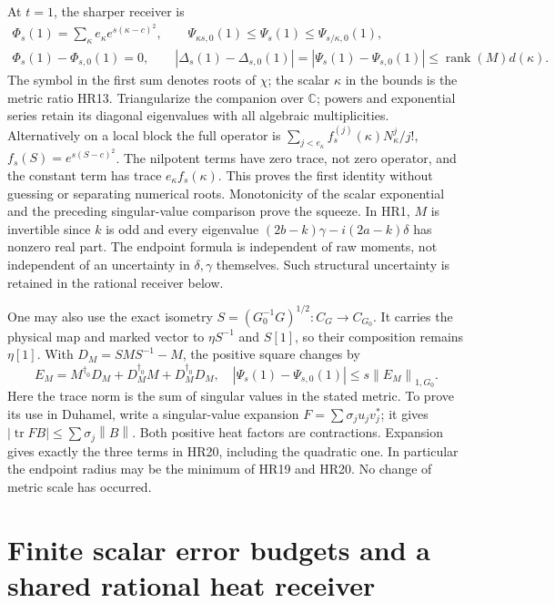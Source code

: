 \documentclass[11pt]{article}
\newcommand{\C}{\mathbb C}\newcommand{\R}{\mathbb R}
\newcommand{\tr}{\operatorname{tr}}\newcommand{\dd}{\dagger_G}
\newcommand{\norm}[1]{\left\lVert#1\right\rVert}
\begin{document}
At \(t=1\), the sharper receiver is
\begin{equation}\tag{HR19}\label{HR19}
\begin{gathered}
\Phi_s(1)=\sum_\kappa e_\kappa e^{s(\kappa-c)^2},\qquad
\Psi_{\kappa s,0}(1)\le\Psi_s(1)\le\Psi_{s/\kappa,0}(1),\\
\Phi_s(1)-\Phi_{s,0}(1)=0,\qquad
|\Delta_s(1)-\Delta_{s,0}(1)|
=|\Psi_s(1)-\Psi_{s,0}(1)|\le \operatorname{rank}(M)d(\kappa).
\end{gathered}
\end{equation}
The symbol in the first sum denotes roots of \(\chi\); the scalar
\(\kappa\) in the bounds is the metric ratio HR13. Triangularize
the companion over \(\C\); powers and exponential series retain its
diagonal eigenvalues with all algebraic multiplicities. Alternatively
on a local block the full operator is
\(\sum_{j<e_\kappa}f_s^{(j)}(\kappa)N_\kappa^j/j!\),
\(f_s(S)=e^{s(S-c)^2}\). The nilpotent terms have zero trace, not
zero operator, and the constant term has trace
\(e_\kappa f_s(\kappa)\). This proves the first identity without
guessing or separating numerical roots. Monotonicity of the scalar
exponential and the preceding singular-value comparison prove the
squeeze. In HR1, \(M\) is invertible since \(k\) is odd and every
eigenvalue \((2b-k)\gamma-i(2a-k)\delta\) has nonzero real part.
The endpoint formula is independent of raw moments, not independent
of an uncertainty in \(\delta,\gamma\) themselves. Such structural
uncertainty is retained in the rational receiver below.

One may also use the exact isometry
\(S=(G_0^{-1}G)^{1/2}:C_G\to C_{G_0}\). It carries the physical
map and marked vector to \(\eta S^{-1}\) and \(S[1]\), so their
composition remains \(\eta[1]\). With \(D_M=SMS^{-1}-M\), the
positive square changes by
\begin{equation}\tag{HR20}\label{HR20}
E_M=M^{\dagger_0}D_M+D_M^{\dagger_0}M+D_M^{\dagger_0}D_M,
\quad |\Psi_s(1)-\Psi_{s,0}(1)|\le s\norm{E_M}_{1,G_0}.
\end{equation}
Here the trace norm is the sum of singular values in the stated
metric. To prove its use in Duhamel, write a singular-value expansion
\(F=\sum\sigma_j u_jv_j^*\); it gives
\(|\tr FB|\le\sum\sigma_j\norm B\). Both positive heat factors
are contractions. Expansion gives exactly the three terms in HR20,
including the quadratic one. In particular the endpoint radius may
be the minimum of HR19 and HR20. No change of metric scale has occurred.

\section{Finite scalar error budgets and a shared rational heat receiver}
\end{document}
